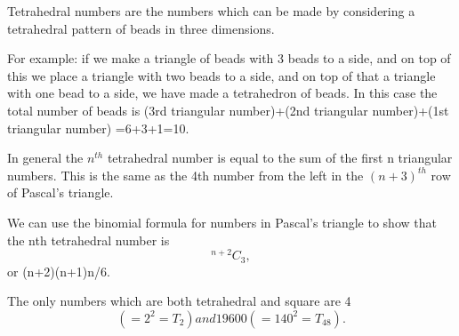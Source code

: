 Tetrahedral numbers are the numbers which can be made by considering a tetrahedral
pattern of beads in three dimensions.
\par
For example: if we make a triangle of beads with 3 beads to a side,
and on top of this we place a triangle with two beads to a side,
and on top of that a triangle with one bead to a side, we have made 
a tetrahedron of beads. In this case the total number of beads is
(3rd triangular number)+(2nd triangular number)+(1st triangular number)
=6+3+1=10.
\par
In general the $n^{th}$  tetrahedral number is equal to the sum of the
first n triangular numbers. This is the same as the 4th number from the left
in the $(n+3)^{th}$  row of Pascal's triangle.
\par
We can use the binomial formula for numbers in Pascal's triangle to
show that the nth tetrahedral number is $$^{n+2}C_{3},$$  
or (n+2)(n+1)n/6.
\par
The only numbers which are both tetrahedral and square are
4 $$(=2^{2}=T_{2}) and 19600 (=140^{2}=T_{48}).$$  
